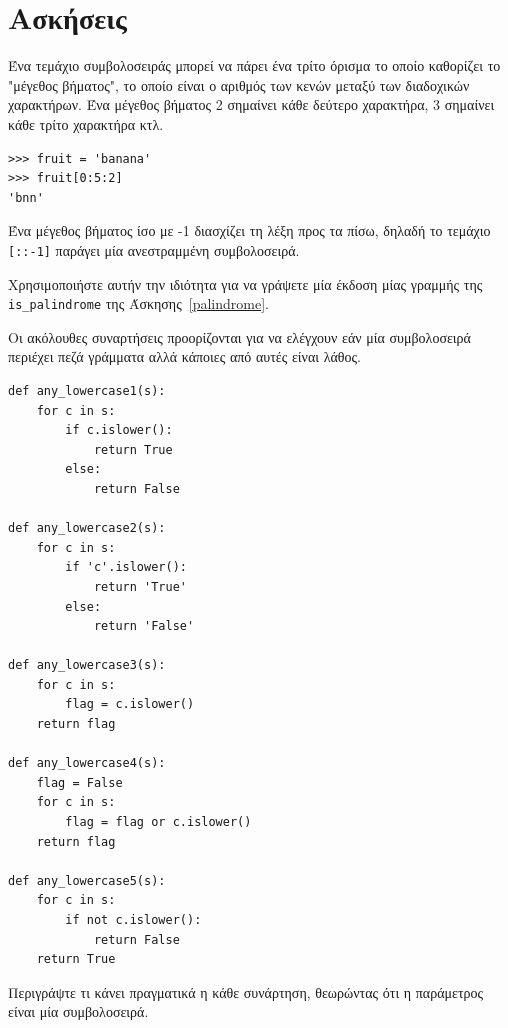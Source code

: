 \documentclass[10pt]{book}
\begin{document}
\section{Ασκήσεις}

\begin{exercise}

Ένα τεμάχιο συμβολοσειράς μπορεί να πάρει ένα τρίτο όρισμα το οποίο καθορίζει το "μέγεθος βήματος", το οποίο είναι ο αριθμός των κενών μεταξύ των διαδοχικών χαρακτήρων. Ένα μέγεθος βήματος 2 σημαίνει κάθε δεύτερο χαρακτήρα, 3 σημαίνει κάθε τρίτο χαρακτήρα κτλ.


\begin{verbatim}
>>> fruit = 'banana'
>>> fruit[0:5:2]
'bnn'
\end{verbatim}


Ένα μέγεθος βήματος ίσο με -1 διασχίζει τη λέξη προς τα πίσω, δηλαδή το τεμάχιο  \verb"[::-1]" παράγει μία ανεστραμμένη συμβολοσειρά.

Χρησιμοποιήστε αυτήν την ιδιότητα για να γράψετε μία έκδοση μίας γραμμής της  \verb"is_palindrome" της Άσκησης~\ref{palindrome}.
\\
\end{exercise}


\begin{exercise}

Οι ακόλουθες συναρτήσεις προορίζονται για να ελέγχουν εάν μία συμβολοσειρά περιέχει πεζά γράμματα αλλά κάποιες από αυτές είναι λάθος.


\begin{verbatim}
def any_lowercase1(s):
    for c in s:
        if c.islower():
            return True
        else:
            return False

def any_lowercase2(s):
    for c in s:
        if 'c'.islower():
            return 'True'
        else:
            return 'False'

def any_lowercase3(s):
    for c in s:
        flag = c.islower()
    return flag

def any_lowercase4(s):
    flag = False
    for c in s:
        flag = flag or c.islower()
    return flag

def any_lowercase5(s):
    for c in s:
        if not c.islower():
            return False
    return True
\end{verbatim}

Περιγράψτε τι κάνει πραγματικά η κάθε συνάρτηση, θεωρώντας ότι η παράμετρος είναι μία συμβολοσειρά.
\\
\end{exercise}
\end{document}

